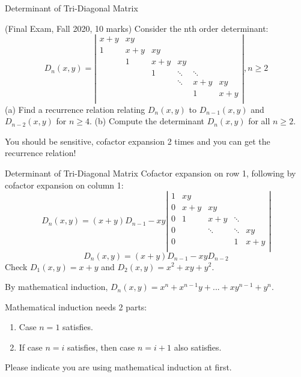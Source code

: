 \documentclass{beamer}
\begin{document}
\begin{frame}{Determinant of Tri-Diagonal Matrix}
\begin{example}
    (Final Exam, Fall 2020, 10 marks) Consider the nth order determinant:
\begin{equation*}
D_n\left( x,y \right) =\left| \begin{matrix}
	x+y&		xy&		&		&		&		\\
	1&		x+y&		xy&		&		&		\\
	&		1&		x+y&		xy&		&		\\
	&		&		1&		\ddots&		\ddots&		\\
	&		&		&		\ddots&		x+y&		xy\\
	&		&		&		&		1&		x+y\\
\end{matrix} \right|, n\geqslant 2
\end{equation*}
(a) Find a recurrence relation relating $D_n(x,y)$ to $D_{n-1}(x,y)$ and $D_{n-2}(x,y)$ for $n\geq 4$.\newline
(b) Compute the determinant $D_n(x,y)$ for all $n\geq 2$.
\end{example}
You should be sensitive, cofactor expansion 2 times and you can get the recurrence relation!
\end{frame}
\begin{frame}{Determinant of Tri-Diagonal Matrix}
Cofactor expansion on row 1, following by cofactor expansion on column 1:
\begin{equation*}
D_n\left( x,y \right) =\left( x+y \right) D_{n-1}-xy\left| \begin{matrix}
	1&		xy&		&		&		\\
	0&		x+y&		xy&		&		\\
	0&		1&		x+y&		\ddots&		\\
	0&		&		\ddots&		\ddots&		xy\\
	0&		&		&		1&		x+y\\
\end{matrix} \right|
\end{equation*}
\begin{equation*}
    D_n\left( x,y \right) =\left( x+y \right) D_{n-1}-xyD_{n-2}
\end{equation*}
Check $D_1\left( x,y \right)=x+y$ and $D_2\left( x,y \right)=x^2+xy+y^2$.

\vspace{3pt}
By mathematical induction, $D_n\left( x,y \right)=x^n+x^{n-1}y+...+xy^{n-1}+y^n$.

\vspace{3pt}
Mathematical induction needs 2 parts:
\begin{enumerate}
    \item Case $n=1$ satisfies.
    \item If case $n=i$ satisfies, then case $n=i+1$ also satisfies.
\end{enumerate}

Please indicate you are using mathematical induction at first.
\end{frame}
\end{document}
